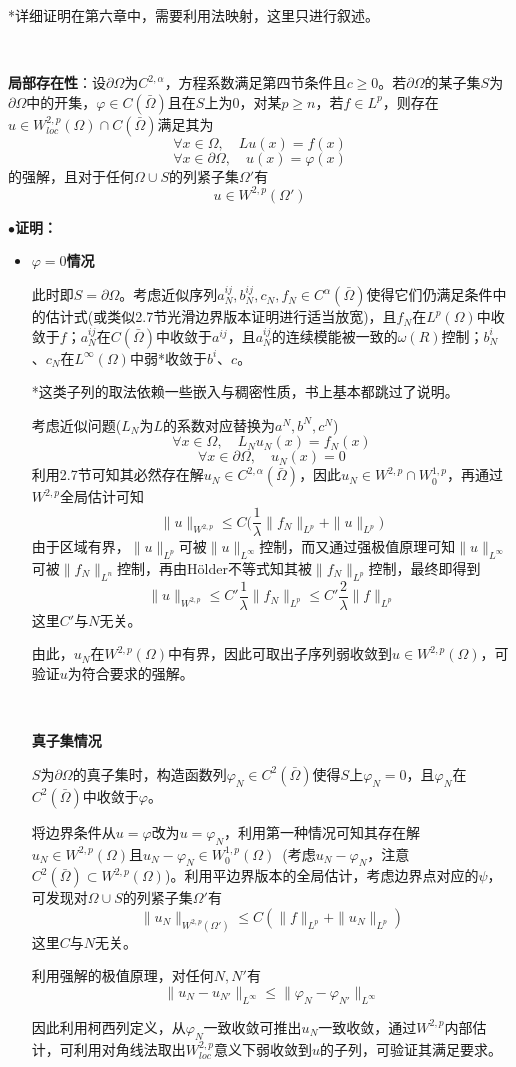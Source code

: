 \documentclass[a4paper,UTF8,fontset=windows,AutoFakeBold]{ctexart}
\newcommand{\proo}[1]{{\kaishu $\bullet$\textbf{证明：}
\begin{itemize}
    \item[] #1
\end{itemize}
}}
\begin{document}
*详细证明在第六章中，需要利用法映射，这里只进行叙述。

\

\textbf{局部存在性}：设$\partial\Omega$为$C^{2,\alpha}$，方程系数满足第四节条件且$c\ge0$。若$\partial\Omega$的某子集$S$为$\partial\Omega$中的开集，$\varphi\in C(\bar\Omega)$且在$S$上为0，对某$p\ge n$，若$f\in L^p$，则存在$u\in W^{2,p}_{loc}(\Omega)\cap C(\bar\Omega)$满足其为$$\forall x\in\Omega,\quad Lu(x)=f(x)$$
$$\forall x\in\partial\Omega,\quad u(x)=\varphi(x)$$
的强解，且对于任何$\Omega\cup S$的列紧子集$\Omega'$有
$$u\in W^{2,p}(\Omega')$$

\proo{
    \textbf{$\varphi=0$情况}

    此时即$S=\partial\Omega$。考虑近似序列$a_N^{ij},b_N^{ij},c_N,f_N\in C^\alpha(\bar\Omega)$使得它们仍满足条件中的估计式(或类似2.7节光滑边界版本证明进行适当放宽)，且$f_N$在$L^p(\Omega)$中收敛于$f$；$a_N^{ij}$在$C(\bar{\Omega})$中收敛于$a^{ij}$，且$a_N^{ij}$的连续模能被一致的$\omega(R)$控制；$b_N^i$、$c_N$在$L^\infty(\Omega)$中弱*收敛于$b^i$、$c$。

    *这类子列的取法依赖一些嵌入与稠密性质，书上基本都跳过了说明。

    考虑近似问题($L_N$为$L$的系数对应替换为$a^N,b^N,c^N$)
    $$\forall x\in\Omega,\quad L_Nu_N(x)=f_N(x)$$
    $$\forall x\in\partial\Omega,\quad u_N(x)=0$$
    利用2.7节可知其必然存在解$u_N\in C^{2,\alpha}(\bar\Omega)$，因此$u_N\in W^{2,p}\cap W_0^{1,p}$，再通过$W^{2,p}$全局估计可知
    $$\|u\|_{W^{2,p}}\le C\bigg(\frac{1}{\lambda}\|f_N\|_{L^p}+\|u\|_{L^p}\bigg)$$
    由于区域有界，$\|u\|_{L^p}$可被$\|u\|_{L^\infty}$控制，而又通过强极值原理可知$\|u\|_{L^\infty}$可被$\|f_N\|_{L^n}$控制，再由H\"older不等式知其被$\|f_N\|_{L^p}$控制，最终即得到
    $$\|u\|_{W^{2,p}}\le C'\frac{1}{\lambda}\|f_N\|_{L^p}\le C'\frac{2}{\lambda}\|f\|_{L^p}$$
    这里$C'$与$N$无关。

    由此，$u_N$在$W^{2,p}(\Omega)$中有界，因此可取出子序列弱收敛到$u\in W^{2,p}(\Omega)$，可验证$u$为符合要求的强解。

    \

    \textbf{真子集情况}

    $S$为$\partial\Omega$的真子集时，构造函数列$\varphi_N\in C^2(\bar\Omega)$使得$S$上$\varphi_N=0$，且$\varphi_N$在$C^2(\bar\Omega)$中收敛于$\varphi$。

    将边界条件从$u=\varphi$改为$u=\varphi_N$，利用第一种情况可知其存在解$u_N\in W^{2,p}(\Omega)$且$u_N-\varphi_N\in W_0^{1,p}(\Omega)$\ (考虑$u_N-\varphi_N$，注意$C^2(\bar\Omega)\subset W^{2,p}(\Omega)$)。利用平边界版本的全局估计，考虑边界点对应的$\psi$，可发现对$\Omega\cup S$的列紧子集$\Omega'$有
    $$\|u_N\|_{W^{2,p}(\Omega')}\le C(\|f\|_{L^p}+\|u_N\|_{L^p})$$
    这里$C$与$N$无关。

    利用强解的极值原理，对任何$N,N'$有
    $$\|u_N-u_{N'}\|_{L^\infty}\le\|\varphi_N-\varphi_{N'}\|_{L^\infty}$$

    因此利用柯西列定义，从$\varphi_N$一致收敛可推出$u_N$一致收敛，通过$W^{2,p}$内部估计，可利用对角线法取出$W_{loc}^{2,p}$意义下弱收敛到$u$的子列，可验证其满足要求。

}
\end{document}
